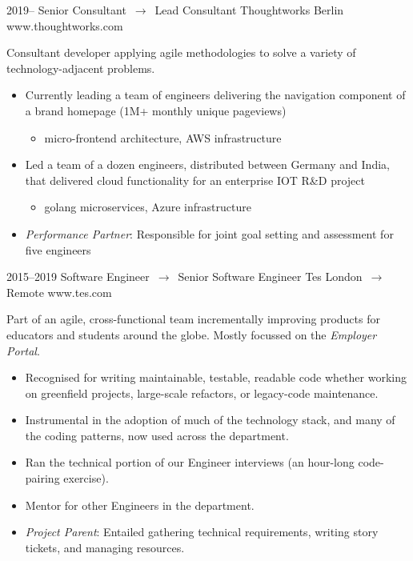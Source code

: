 \documentclass[11pt, a4paper, sans]{moderncv}
\begin{document}
\cventry
  {2019--}
  {Senior Consultant $\,\to\,$ Lead Consultant}
  {Thoughtworks}
  {Berlin}
  {www.thoughtworks.com}
  {
		Consultant developer applying agile methodologies to solve a variety of technology-adjacent problems.
    \begin{itemize}
      \item Currently leading a team of engineers delivering the navigation component of a brand homepage (1M+ monthly unique pageviews)
			\begin{itemize}
				\item micro-frontend architecture, AWS infrastructure
			\end{itemize}
			\item Led a team of a dozen engineers, distributed between Germany and India, that delivered cloud functionality for an enterprise IOT R\&D project
			\begin{itemize}
				\item golang microservices, Azure infrastructure
			\end{itemize}
			\item \emph{Performance Partner}: Responsible for joint goal setting and assessment for five engineers
    \end{itemize}
	}

\vspace*{3mm}

\cventry
  {2015--2019}
  {Software Engineer $\,\to\,$ Senior Software Engineer}
  {Tes}
  {London $\,\to\,$ Remote}
  {www.tes.com}
  {
    Part of an agile, cross-functional team incrementally improving products for educators and students around the globe. Mostly focussed on the \emph{Employer Portal}.
    \begin{itemize}
      \item Recognised for writing maintainable, testable, readable code whether working on greenfield projects, large-scale refactors, or legacy-code maintenance.
      \item Instrumental in the adoption of much of the technology stack, and many of the coding patterns, now used across the department.
      \item Ran the technical portion of our Engineer interviews (an hour-long code-pairing exercise).
      \item Mentor for other Engineers in the department.
      \item \emph{Project Parent}: Entailed gathering technical requirements, writing story tickets, and managing resources.
    \end{itemize}
  }
\end{document}
